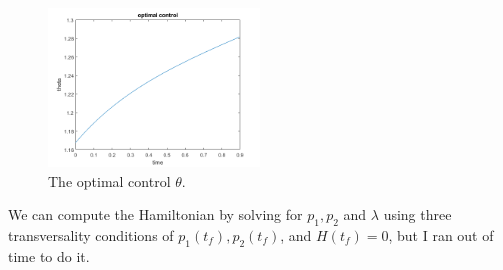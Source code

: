 \documentclass[12pt]{article}
\begin{document}
\begin{problem}[4]
\begin{enumerate}[label=(\alph*)]
\begin{figure}[H]
	\includegraphics[width=0.5\textwidth]{./figures/5.4c.2.png}
	\caption{The optimal control $ \theta$.}
\end{figure}
We can compute the Hamiltonian by solving for $ p_1,p_2$ and $ \lambda$ using three transversality conditions of $ p_1(t_f),p_2(t_f)$, and $ H(t_f) =0$, but I ran out of time to do it.

\end{enumerate}
\end{problem}
\end{document}
